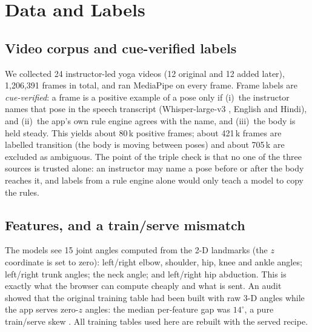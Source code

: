\section{Data and Labels}\label{sec:data}
\subsection{Video corpus and cue-verified labels}
We collected 24 instructor-led yoga videos (12 original and 12 added later), 1{,}206{,}391 frames in total, and ran MediaPipe on every frame. Frame labels are \emph{cue-verified}: a frame is a positive example of a pose only if (i)~the instructor names that pose in the speech transcript (Whisper-large-v3 \cite{radford2023whisper}, English and Hindi), and (ii)~the app's own rule engine agrees with the name, and (iii)~the body is held steady. This yields about 80\,k positive frames; about 421\,k frames are labelled transition (the body is moving between poses) and about 705\,k are excluded as ambiguous. The point of the triple check is that no one of the three sources is trusted alone: an instructor may name a pose before or after the body reaches it, and labels from a rule engine alone would only teach a model to copy the rules.

\subsection{Features, and a train/serve mismatch}\label{sec:features}
The models see 15 joint angles computed from the 2-D landmarks (the $z$ coordinate is set to zero): left/right elbow, shoulder, hip, knee and ankle angles; left/right trunk angles; the neck angle; and left/right hip abduction. This is exactly what the browser can compute cheaply and what is sent. An audit showed that the original training table had been built with raw 3-D angles while the app serves zero-$z$ angles: the median per-feature gap was $14^\circ$, a pure train/serve skew \cite{sculley2015debt}. All training tables used here are rebuilt with the served recipe.

